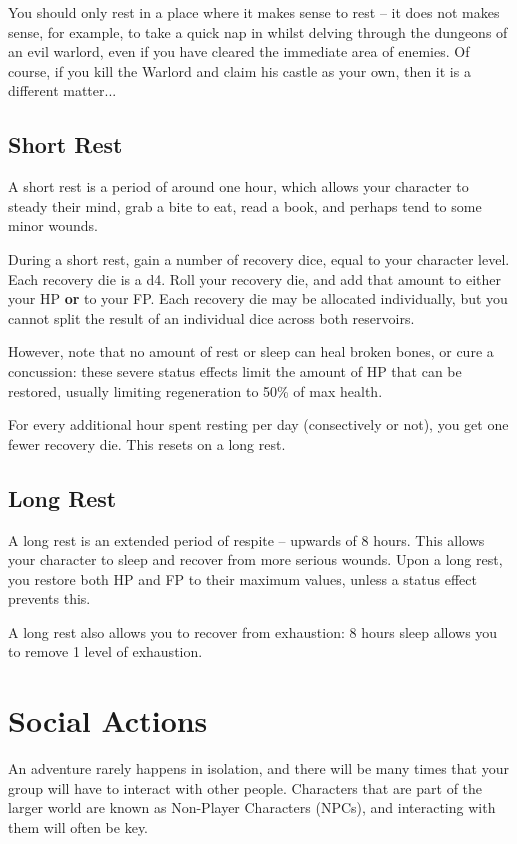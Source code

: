 You should only rest in a place where it makes sense to rest – it does not makes sense, for example, to take a quick nap in whilst delving through the dungeons of an evil warlord, even if you have cleared the immediate area of enemies. Of course, if you kill the Warlord and claim his castle as your own, then it is a different matter...

\subsection{Short Rest}

A short rest is a period of around one hour, which allows your character to steady their mind, grab a bite to eat, read a book, and perhaps tend to some minor wounds.


During a short rest, gain a number of recovery dice, equal to your character level. Each recovery die is a d4. Roll your recovery die, and add that amount to either your HP {\bf or} to your FP. Each recovery die may be allocated individually, but you cannot split the result of an individual dice across both reservoirs. 

However, note that no amount of rest or sleep can heal broken bones, or cure a concussion: these severe status effects limit the amount of HP that can be restored, usually limiting regeneration to 50\% of max health. 

For every additional hour spent resting per day (consectively or not), you get one fewer recovery die. This resets on a long rest.

\subsection{Long Rest}

A long rest is an extended period of respite -- upwards of 8 hours. This allows your character to sleep and recover from more serious wounds. Upon a long rest, you restore both HP and FP to their maximum values, unless a status effect prevents this. 

A long rest also allows you to recover from exhaustion: 8 hours sleep allows you to remove 1 level of exhaustion. 

\section{Social Actions}

An adventure rarely happens in isolation, and there will be many times that your group will have to interact with other people. Characters that are part of the larger world are known as Non-Player Characters (NPCs), and interacting with them will often be key. 

